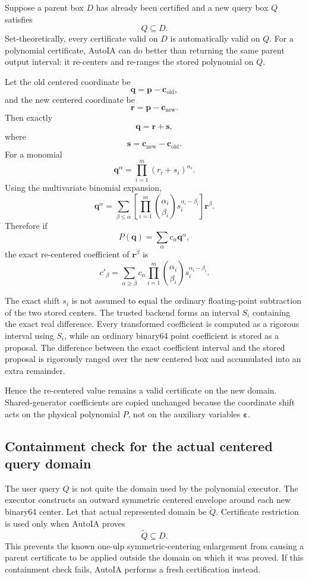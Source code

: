 \documentclass[11pt]{article}
\newcommand{\epsv}{\boldsymbol{\varepsilon}}
\newcommand{\qv}{\mathbf{q}}
\newcommand{\pv}{\mathbf{p}}
\begin{document}
Suppose a parent box \(D\) has already been certified and a new query box \(Q\)
satisfies
\[
  Q\subseteq D.
\]
Set-theoretically, every certificate valid on \(D\) is automatically valid on
\(Q\).  For a polynomial certificate, AutoIA can do better than returning the
same parent output interval: it re-centers and re-ranges the stored polynomial on
\(Q\).

Let the old centered coordinate be
\[
  \qv=\pv-\mathbf{c}_{\mathrm{old}},
\]
and the new centered coordinate be
\[
  \mathbf{r}=\pv-\mathbf{c}_{\mathrm{new}}.
\]
Then exactly
\[
  \qv=\mathbf{r}+\mathbf{s},
\]
where
\[
  \mathbf{s}=\mathbf{c}_{\mathrm{new}}-\mathbf{c}_{\mathrm{old}}.
\]
For a monomial
\[
  \qv^\alpha=\prod_{i=1}^m(r_i+s_i)^{\alpha_i}.
\]
Using the multivariate binomial expansion,
\[
  \qv^\alpha
  =
  \sum_{\beta\le\alpha}
  \left[
  \prod_{i=1}^m
  \binom{\alpha_i}{\beta_i}
  s_i^{\alpha_i-\beta_i}
  \right]
  \mathbf{r}^\beta.
\]
Therefore if
\[
  P(\qv)=\sum_\alpha c_\alpha\qv^\alpha,
\]
the exact re-centered coefficient of \(\mathbf{r}^\beta\) is
\[
  c'_\beta
  =
  \sum_{\alpha\ge\beta}
  c_\alpha
  \prod_{i=1}^m
  \binom{\alpha_i}{\beta_i}
  s_i^{\alpha_i-\beta_i}.
\]

The exact shift \(s_i\) is not assumed to equal the ordinary floating-point
subtraction of the two stored centers.  The trusted backend forms an interval
\(S_i\) containing the exact real difference.  Every transformed coefficient is
computed as a rigorous interval using \(S_i\), while an ordinary binary64 point
coefficient is stored as a proposal.  The difference between the exact coefficient
interval and the stored proposal is rigorously ranged over the new centered box
and accumulated into an extra remainder.

Hence the re-centered value remains a valid certificate on the new domain.
Shared-generator coefficients are copied unchanged because the coordinate shift
acts on the physical polynomial \(P\), not on the auxiliary variables \(\epsv\).

\subsection{Containment check for the actual centered query domain}

The user query \(Q\) is not quite the domain used by the polynomial executor.
The executor constructs an outward symmetric centered envelope around each new
binary64 center.  Let that actual represented domain be \(\widetilde Q\).
Certificate restriction is used only when AutoIA proves
\[
  \widetilde Q\subseteq D.
\]
This prevents the known one-ulp symmetric-centering enlargement from causing a
parent certificate to be applied outside the domain on which it was proved.  If
this containment check fails, AutoIA performs a fresh certification instead.
\end{document}
